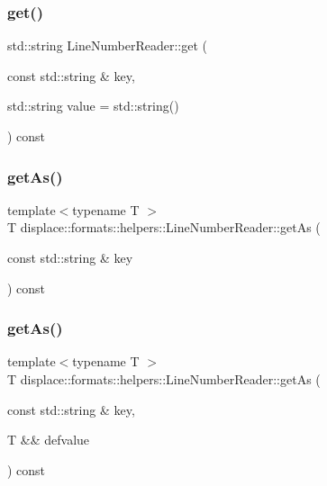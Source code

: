 \subsubsection{\texorpdfstring{get()}{get()}}
{\footnotesize\ttfamily std\+::string Line\+Number\+Reader\+::get (\begin{DoxyParamCaption}\item[{const std\+::string \&}]{key,  }\item[{std\+::string}]{value = {\ttfamily std\+:\+:string()} }\end{DoxyParamCaption}) const}

\mbox{\label{classdisplace_1_1formats_1_1helpers_1_1_line_number_reader_a62f2b6cfe881ec3dc782fd825fe11fca}} 
\subsubsection{\texorpdfstring{getAs()}{getAs()}\hspace{0.1cm}{\footnotesize\ttfamily [1/2]}}
{\footnotesize\ttfamily template$<$typename T $>$ \\
T displace\+::formats\+::helpers\+::\+Line\+Number\+Reader\+::get\+As (\begin{DoxyParamCaption}\item[{const std\+::string \&}]{key }\end{DoxyParamCaption}) const\hspace{0.3cm}{\ttfamily [inline]}}

\mbox{\label{classdisplace_1_1formats_1_1helpers_1_1_line_number_reader_a637d63d470d9ff80fe97a9d389a7bcf8}} 
\subsubsection{\texorpdfstring{getAs()}{getAs()}\hspace{0.1cm}{\footnotesize\ttfamily [2/2]}}
{\footnotesize\ttfamily template$<$typename T $>$ \\
T displace\+::formats\+::helpers\+::\+Line\+Number\+Reader\+::get\+As (\begin{DoxyParamCaption}\item[{const std\+::string \&}]{key,  }\item[{T \&\&}]{defvalue }\end{DoxyParamCaption}) const\hspace{0.3cm}{\ttfamily [inline]}}

